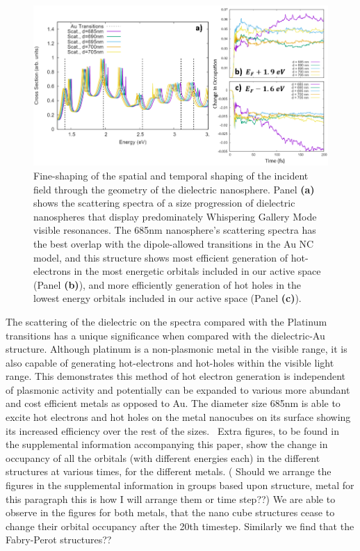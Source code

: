 \documentclass[journal=jpclcd,manuscript=letter]{achemso}
\begin{document}
\begin{figure}
\begin{center}
\includegraphics[width=6in]{figs/Au_WGM_Spectrum_and_Trajectories.png}
\caption{Fine-shaping of the spatial and temporal shaping of the incident field
through the geometry of the dielectric nanosphere.  Panel {\bf (a)} shows
the scattering spectra of a size progression of dielectric nanospheres that display
predominately Whispering Gallery Mode visible resonances.  The
685nm nanosphere's scattering spectra has the best overlap with the dipole-allowed
transitions in the Au NC model, and this structure shows most efficient
generation of hot-electrons in the most energetic orbitals included in our
active space (Panel {\bf (b)}), and more efficiently generation of
hot holes in the lowest energy orbitals included in our active space (Panel
{\bf (c)}).   }
\end{center}
\end{figure}
The scattering of the dielectric on the spectra compared with the Platinum transitions has a unique significance when 
compared with the dielectric-Au structure. Although platinum is a non-plasmonic metal in the visible range, it is also 
capable of generating hot-electrons and hot-holes within the visible light range. This demonstrates this method of 
hot electron generation is independent of plasmonic activity and potentially can be expanded to various more abundant and cost efficient metals as opposed to Au. 
The diameter size 685nm is able to excite hot electrons and hot holes on the metal nanocubes on its surface showing its increased 
efficiency over the rest of the sizes. 
Extra figures, to be found in the supplemental information accompanying this paper, show the change in 
occupancy of all the orbitals (with different energies each) in the different structures at various times, 
for the different metals. ( Should we arrange the figures in the supplemental information in groups based 
upon structure, metal {for this paragraph this is how I will arrange them} or time step??) We are able to 
observe in the figures for both metals, that the nano cube structures cease to change their orbital 
occupancy after the 20th timestep. Similarly we find that the Fabry-Perot structures??
\end{document}

